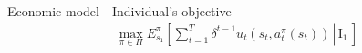 \begin{frame}{Economic model - Individual's objective}
\begin{align*}
\max_{\pi \in\Pi} E_{s_1}^\pi\left[\left.\sum^{T}_{t = 1}  \delta^{t - 1} u_t(s_t, a^\pi_t(s_t))\,\right\vert\,\mathrm{I}_1\,\right]
\end{align*}
\end{frame}
